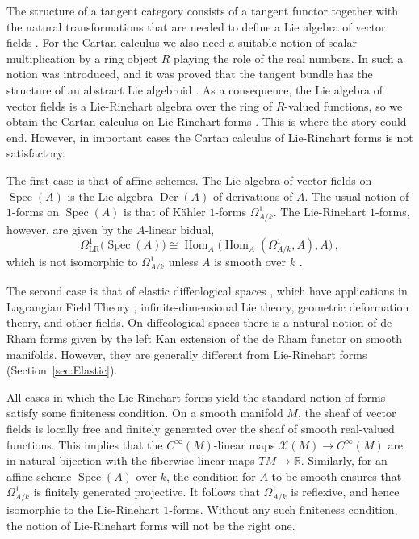 \documentclass[12pt,reqno, a4paper]{amsart}
\numberwithin{equation}{section}
\theoremstyle{plain}
\theoremstyle{definition}
\theoremstyle{remark}
\DeclareMathOperator{\Der}{Der}
\DeclareMathOperator{\Hom}{Hom}
\newcommand{\bbR}{\mathbb{R}}
\newcommand{\calX}{\mathcal{X}}
\DeclareMathOperator{\Spec}{Spec}
\begin{document}
The structure of a tangent category consists of a tangent functor together with the natural transformations that are needed to define a Lie algebra of vector fields \cite{Rosicky:1984, CockettCruttwell:2015}. For the Cartan calculus we also need a suitable notion of scalar multiplication by a ring object $R$ playing the role of the real numbers. In \cite{AintablianBlohmann:2026} such a notion was introduced, and it was proved that the tangent bundle has the structure of an abstract Lie algebroid \cite[Def.~7.1]{AintablianBlohmann:2026}. As a consequence, the Lie algebra of vector fields is a Lie-Rinehart algebra \cite{Rinehart:1963} over the ring of $R$-valued functions, so we obtain the Cartan calculus on Lie-Rinehart forms \cite[Thm.~6.13]{AintablianBlohmann:2026}. This is where the story could end. However, in important cases the Cartan calculus of Lie-Rinehart forms is not satisfactory.

The first case is that of affine schemes. The Lie algebra of vector fields on $\Spec(A)$ is the Lie algebra $\Der(A)$ of derivations of $A$. The usual notion of $1$-forms on $\Spec(A)$ is that of K\"ahler $1$-forms $\Omega^1_{A/k}$. The Lie-Rinehart $1$-forms, however, are given by the $A$-linear bidual,
\begin{equation*}
  \Omega^1_\mathrm{LR}\bigl( \Spec(A) \bigr)
  \cong
  \Hom_A\bigl( \Hom_A(\Omega^1_{A/k}, A), A \bigr)
  \,,
\end{equation*}
which is not isomorphic to $\Omega^1_{A/k}$ unless $A$ is smooth over $k$ \cite[\S 7.7]{AintablianBlohmann:2026}.

The second case is that of elastic diffeological spaces \cite{Blohmann:2024a}, which have applications in Lagrangian Field Theory \cite{Blohmann:2024b}, infinite-dimensional Lie theory, geometric deformation theory, and other fields. On diffeological spaces there is a natural notion of de Rham forms \cite[\S 6.28]{IglesiasZemmour:2013} given by the left Kan extension of the de Rham functor on smooth manifolds. However, they are generally different from Lie-Rinehart forms (Section~\ref{sec:Elastic}).

All cases in which the Lie-Rinehart forms yield the standard notion of forms satisfy some finiteness condition. On a smooth manifold $M$, the sheaf of vector fields is locally free and finitely generated over the sheaf of smooth real-valued functions. This implies that the $C^\infty(M)$-linear maps $\calX(M) \to C^\infty(M)$ are in natural bijection with the fiberwise linear maps $TM \to \bbR$. Similarly, for an affine scheme $\Spec(A)$ over $k$, the condition for $A$ to be smooth ensures that $\Omega^1_{A/k}$ is finitely generated projective. It follows that $\Omega^1_{A/k}$ is reflexive, and hence isomorphic to the Lie-Rinehart $1$-forms. Without any such finiteness condition, the notion of Lie-Rinehart forms will not be the right one.
\end{document}

